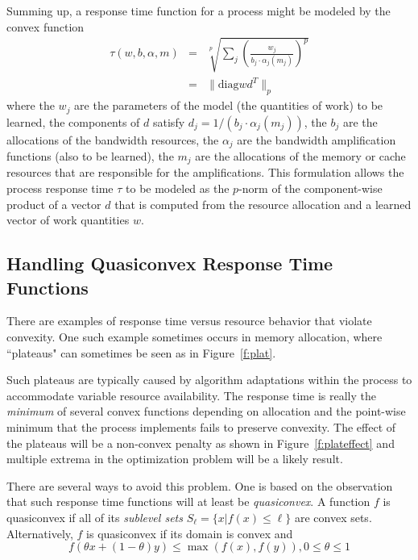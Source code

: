 Summing up, a response time function for a process might be modeled by the convex function
\begin{eqnarray*}
\tau(w,b,\alpha,m) &=& \sqrt[p]{\sum_j \left(\frac{w_j}{b_j\cdot\alpha_j(m_j)}\right)^p}  \\
                   &=& \|\mbox{diag} wd^T \|_p
\end{eqnarray*}
where the $w_j$ are the parameters of the model (the quantities of work) to be learned,
the components of $d$ satisfy $d_j = 1/(b_j\cdot\alpha_j(m_j))$,
the $b_j$  are the allocations of the bandwidth resources,
the $\alpha_j$ are the bandwidth amplification functions (also to be learned),
the $m_j$ are the allocations of the memory or cache resources that are responsible for the amplifications.
This formulation allows the process response time $\tau$ to be modeled as the $p$-norm of
the component-wise product of a vector $d$ that is computed from the resource allocation
and a learned vector of work quantities $w$.

\subsection*{Handling Quasiconvex Response Time Functions}

There are examples of response time versus resource behavior that violate convexity.  One such example sometimes occurs in memory allocation, where ``plateaus" can sometimes be seen as in Figure~\ref{f:plat}.

Such plateaus are typically caused by algorithm adaptations within the process to accommodate variable resource availability.  The response time is really the \emph{minimum} of several convex functions depending on allocation and the point-wise minimum that the process implements fails to preserve convexity.  The effect of the plateaus will be a non-convex penalty as shown in Figure~\ref{f:plateffect} and multiple extrema in the optimization problem will be a likely result.

There are several ways to avoid this problem.  One is based on the observation that such response time functions
will at least be \emph{quasiconvex}.  A function $f$ is quasiconvex if all of its \emph{sublevel sets}
$S_\ell = \{x | f(x) \leq \ell\}$ are convex sets.
Alternatively, $f$ is quasiconvex if its domain is convex and
\begin{displaymath}
f(\theta x + (1-\theta)y) \leq \max(f(x),f(y)), 0 \leq \theta \leq 1
\end{displaymath}

